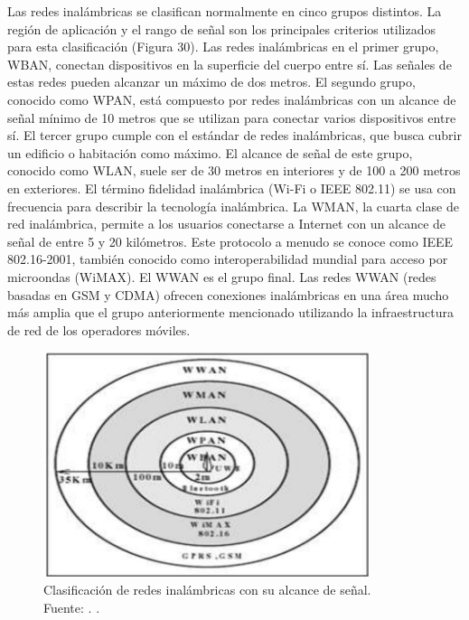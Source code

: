 Las redes inalámbricas se clasifican normalmente en cinco grupos distintos. La región de aplicación y el rango de señal son los principales criterios utilizados para esta clasificación (Figura 30). Las redes inalámbricas en el primer grupo, WBAN, conectan dispositivos en la superficie del cuerpo entre sí. Las señales de estas redes pueden alcanzar un máximo de dos metros. El segundo grupo, conocido como WPAN, está compuesto por redes inalámbricas con un alcance de señal mínimo de 10 metros que se utilizan para conectar varios dispositivos entre sí. El tercer grupo cumple con el estándar de redes inalámbricas, que busca cubrir un edificio o habitación como máximo. El alcance de señal de este grupo, conocido como WLAN, suele ser de 30 metros en interiores y de 100 a 200 metros en exteriores. El término fidelidad inalámbrica (Wi-Fi o IEEE 802.11) se usa con frecuencia para describir la tecnología inalámbrica. La WMAN, la cuarta clase de red inalámbrica, permite a los usuarios conectarse a Internet con un alcance de señal de entre 5 y 20 kilómetros. Este protocolo a menudo se conoce como IEEE 802.16-2001, también conocido como interoperabilidad mundial para acceso por microondas (WiMAX). El WWAN es el grupo final. Las redes WWAN (redes basadas en GSM y CDMA) ofrecen conexiones inalámbricas en una área mucho más amplia que el grupo anteriormente mencionado utilizando la infraestructura de red de los operadores móviles. \parencite{tec_ieee2010draft}
\begin{figure}[!ht]
	\begin{center}
		\includegraphics[width=0.85\textwidth]{2/figures/clasificacionredes.jpg}
		\caption[Clasificación de redes inalámbricas con su alcance de señal]{Clasificación de redes inalámbricas con su alcance de señal.\\
			Fuente: \cite{tec_ieee2010draft}. .}
		\label{2:fig52}
	\end{center}
\end{figure}

